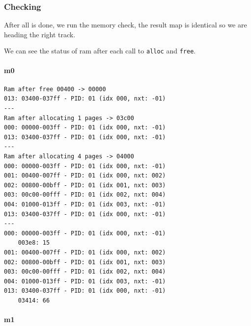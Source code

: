 \documentclass[]{article}
\let\oldparagraph\paragraph
\renewcommand{\paragraph}[1]{\oldparagraph{#1}\mbox{}}
\begin{document}
\subsubsection{Checking}\label{checking}

After all is done, we run the memory check, the result map is identical
so we are heading the right track.

We can see the status of ram after each call to \texttt{alloc} and
\texttt{free}.

\paragraph{m0}\label{m0}

\begin{verbatim}
Ram after free 00400 -> 00000
013: 03400-037ff - PID: 01 (idx 000, nxt: -01)
---
Ram after allocating 1 pages -> 03c00
000: 00000-003ff - PID: 01 (idx 000, nxt: -01)
013: 03400-037ff - PID: 01 (idx 000, nxt: -01)
---
Ram after allocating 4 pages -> 04000
000: 00000-003ff - PID: 01 (idx 000, nxt: -01)
001: 00400-007ff - PID: 01 (idx 000, nxt: 002)
002: 00800-00bff - PID: 01 (idx 001, nxt: 003)
003: 00c00-00fff - PID: 01 (idx 002, nxt: 004)
004: 01000-013ff - PID: 01 (idx 003, nxt: -01)
013: 03400-037ff - PID: 01 (idx 000, nxt: -01)
---
000: 00000-003ff - PID: 01 (idx 000, nxt: -01)
    003e8: 15
001: 00400-007ff - PID: 01 (idx 000, nxt: 002)
002: 00800-00bff - PID: 01 (idx 001, nxt: 003)
003: 00c00-00fff - PID: 01 (idx 002, nxt: 004)
004: 01000-013ff - PID: 01 (idx 003, nxt: -01)
013: 03400-037ff - PID: 01 (idx 000, nxt: -01)
    03414: 66
\end{verbatim}

\paragraph{m1}\label{m1}
\end{document}
